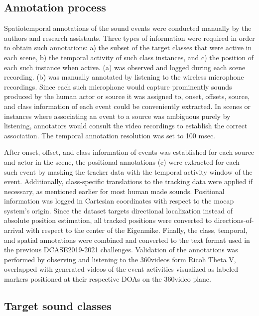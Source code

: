 \documentclass{article}
\begin{document}
\begin{sloppy}
\subsection{Annotation process}

Spatiotemporal annotations of the sound events were conducted manually by the authors and research assistants. Three types of information were required in order to obtain such annotations: a) the subset of the target classes that were active in each scene, b) the temporal activity of such class instances, and c) the position of each such instance when active. (a) was observed and logged during each scene recording. (b) was manually annotated by listening to the wireless microphone recordings. Since each such microphone would capture prominently sounds produced by the human actor or source it was assigned to, onset, offsets, source, and class information of each event could be conveniently extracted. In scenes or instances where associating an event to a source was ambiguous purely by listening, annotators would consult the video recordings to establish the correct association. The temporal annotation resolution was set to 100 msec.

After onset, offset, and class information of events was established for each source and actor in the scene, the positional annotations (c) were extracted for each such event by masking the tracker data with the temporal activity window of the event. Additionally, class-specific translations to the tracking data were applied if necessary, as mentioned earlier for most human made sounds. Positional information was logged in Cartesian coordinates with respect to the mocap system's origin. Since the dataset targets directional localization instead of absolute position estimation, all tracked positions were converted to directions-of-arrival with respect to the center of the Eigenmike. Finally, the class, temporal, and spatial annotations were combined and converted to the text format used in the previous DCASE2019-2021 challenges. Validation of the annotations was performed by observing and listening to the 360\degree videos form Ricoh Theta V, overlapped with generated videos of the event activities visualized as labeled markers positioned at their respective DOAs on the 360\degree video plane.




\subsection{Target sound classes}


\end{sloppy}
\end{document}
